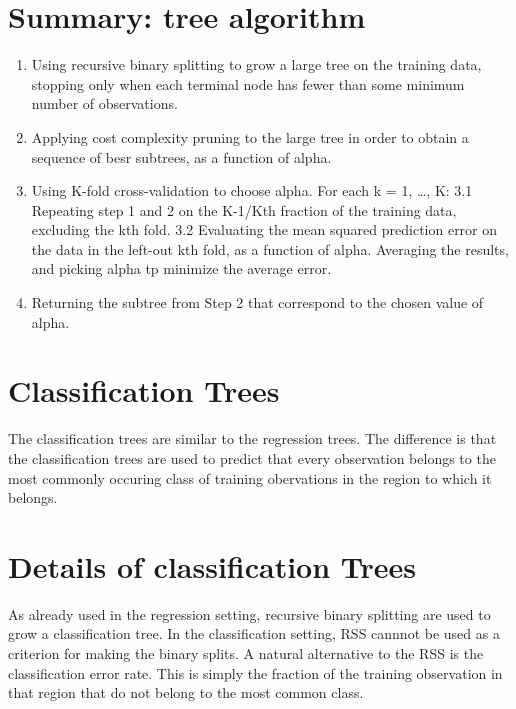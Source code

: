 \documentclass[]{report}
\providecommand{\tightlist}{%
  \setlength{\itemsep}{0pt}\setlength{\parskip}{0pt}}
\begin{document}
\section{Summary: tree algorithm}\label{summary-tree-algorithm}

\begin{enumerate}
\def\labelenumi{\arabic{enumi}.}
\tightlist
\item
  Using recursive binary splitting to grow a large tree on the training
  data, stopping only when each terminal node has fewer than some
  minimum number of observations.
\item
  Applying cost complexity pruning to the large tree in order to obtain
  a sequence of besr subtrees, as a function of alpha.
\item
  Using K-fold cross-validation to choose alpha. For each k = 1,
  \ldots{}, K: 3.1 Repeating step 1 and 2 on the K-1/Kth fraction of the
  training data, excluding the kth fold. 3.2 Evaluating the mean squared
  prediction error on the data in the left-out kth fold, as a function
  of alpha. Averaging the results, and picking alpha tp minimize the
  average error.
\item
  Returning the subtree from Step 2 that correspond to the chosen value
  of alpha.
\end{enumerate}

\section{Classification Trees}\label{classification-trees}

The classification trees are similar to the regression trees. The
difference is that the classification trees are used to predict that
every observation belongs to the most commonly occuring class of
training obervations in the region to which it belongs.

\section{Details of classification
Trees}\label{details-of-classification-trees}

As already used in the regression setting, recursive binary splitting
are used to grow a classification tree. In the classification setting,
RSS cannnot be used as a criterion for making the binary splits. A
natural alternative to the RSS is the classification error rate. This is
simply the fraction of the training observation in that region that do
not belong to the most common class.
\end{document}
